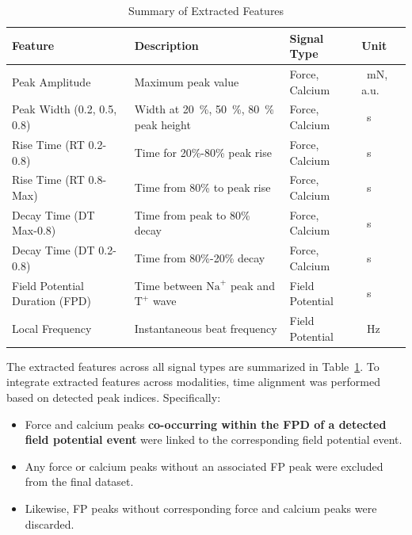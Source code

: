 \documentclass{report}
\begin{document}
        \begin{table}[H]
            \centering
            \caption{Summary of Extracted Features}
            \label{tab:features-summary}
            \begin{tabular}{l l l l}
                \toprule
                \textbf{Feature} & \textbf{Description} & \textbf{Signal Type} & \textbf{Unit} \\
                \midrule
                Peak Amplitude & Maximum peak value & Force, Calcium & \SI{}{\milli\newton}, a.u. \\
                Peak Width (0.2, 0.5, 0.8) & Width at 20\SI{}{\percent}, 50\SI{}{\percent}, 80\SI{}{\percent} peak height & Force, Calcium & \SI{}{\s} \\
                Rise Time (RT 0.2-0.8) & Time for 20\%-80\% peak rise & Force, Calcium & \SI{}{\s} \\
                Rise Time (RT 0.8-Max) & Time from 80\% to peak rise & Force, Calcium & \SI{}{\s} \\
                Decay Time (DT Max-0.8) & Time from peak to 80\% decay & Force, Calcium & \SI{}{\s} \\
                Decay Time (DT 0.2-0.8) & Time from 80\%-20\% decay & Force, Calcium & \SI{}{\s} \\
                Field Potential Duration (FPD) & Time between \(\text{Na}^+\) peak and \(\text{T}^+\) wave & Field Potential & \SI{}{\s} \\
                Local Frequency & Instantaneous beat frequency & Field Potential & \SI{}{\hertz} \\
                \bottomrule
            \end{tabular}
        \end{table}
        
        
        The extracted features across all signal types are summarized in Table~\ref{tab:features-summary}. To integrate extracted features across modalities, time alignment was performed based on detected peak indices. Specifically:
        \begin{itemize}
            \item Force and calcium peaks \textbf{co-occurring within the FPD of a detected field potential event} were linked to the corresponding field potential event.
            \item Any force or calcium peaks without an associated FP peak were excluded from the final dataset.
            \item  Likewise, FP peaks without corresponding force and calcium peaks were discarded.
        \end{itemize}
       
\end{document}
